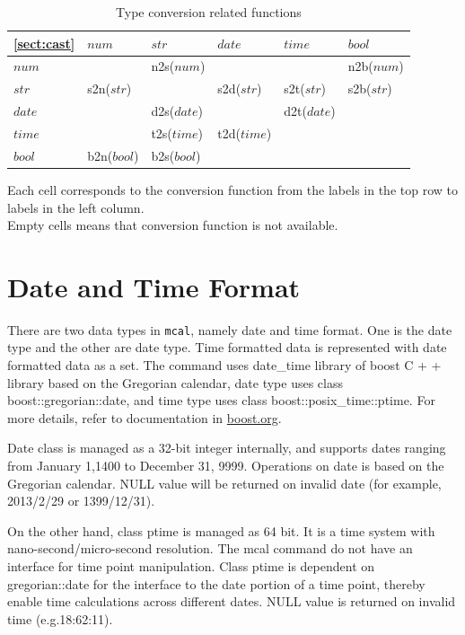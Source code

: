 \begin{table}[!hb]
\begin{center}
\caption{Type conversion related functions \label{tbl:mcal_cast}}
{\small
\begin{tabular}{l|l|l|l|l|l} \hline
\ref{sect:cast} & $num$       & $str$       & $date$     & $time$     & $bool$     \\
\hline
\hline
$num$  &             & n2s($num$)  &            &            & n2b($num$) \\
\hline
$str$  & s2n($str$)  &             & s2d($str$) & s2t($str$) & s2b($str$) \\
\hline
$date$ &             & d2s($date$) &            & d2t($date$)& \\
\hline
$time$ &             & t2s($time$) & t2d($time$)&            & \\
\hline
$bool$ & b2n($bool$) & b2s($bool$) &            &            & \\
\hline
  \end{tabular}
 
Each cell corresponds to the conversion function from the labels in the top row  to labels in the left column. 
\\Empty cells means that conversion function is not available. 

  }
  \end{center}
\end{table}

\section{Date and Time Format\label{sect:datetime}}
There are two data types in \verb|mcal|, namely date and time format. One is the date type and the other are date type. Time formatted data is represented with date formatted data as a set. The command uses date\_time library of boost C + + library based on the Gregorian calendar, date type uses class boost::gregorian::date, and time type uses class boost::posix\_time::ptime. For more details, refer to documentation in \href{http://www.boost.org/}{boost.org}. 

Date class is managed as a 32-bit integer internally, and supports dates ranging from January 1,1400 to December 31, 9999. Operations on date is based on the Gregorian calendar. NULL value will be returned on invalid date (for example, 2013/2/29 or 1399/12/31).

On the other hand, class ptime is managed as 64 bit. It is a time system with nano-second/micro-second resolution. The mcal command do not have an interface for time point manipulation. Class ptime is dependent on gregorian::date for the interface to the date portion of a time point, thereby enable time calculations across different dates. NULL value is returned on invalid time (e.g.18:62:11).  

